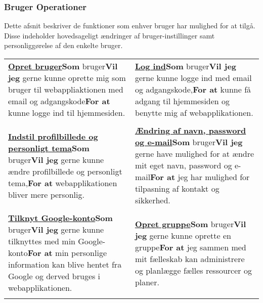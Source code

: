 \subsubsection{Bruger Operationer}

\noindent Dette afsnit beskriver de funktioner som enhver bruger har mulighed for at tilgå. Disse indeholder hovedsageligt ændringer af bruger-instillinger samt personliggørelse af den enkelte bruger.\newline

\begin{tabular}{p{2.5in}p{2.5in}}
\textbf{\underline{Opret bruger}}\newline \textbf{Som} bruger\newline \textbf{Vil jeg} gerne kunne oprette mig som bruger til webappliaktionen med email og adgangskode\newline \textbf{For at} kunne logge ind til hjemmesiden. &

\textbf{\underline{Log ind}}\newline \textbf{Som} bruger\newline \textbf{Vil jeg} gerne kunne logge ind med email og adgangskode,\newline \textbf{For at} kunne få adgang til hjemmesiden og benytte mig af webapplikationen.  \\\\

\textbf{\underline{Indstil profilbillede og personligt tema}}\newline \textbf{Som} bruger\newline \textbf{Vil jeg} gerne kunne ændre profilbillede og personligt tema,\newline \textbf{For at} webapplikationen bliver mere personlig.  &  

\textbf{\underline{Ændring af navn, password og e-mail}}\newline \textbf{Som} bruger\newline \textbf{Vil jeg} gerne have mulighed for at ændre mit eget navn, password og e-mail\newline \textbf{For at} jeg har mulighed for tilpasning af kontakt og sikkerhed.  \\\\

\textbf{\underline{Tilknyt Google-konto}}\newline \textbf{Som} bruger\newline \textbf{Vil jeg} gerne kunne tilknyttes med min Google-konto\newline \textbf{For at} min personlige information kan blive hentet fra Google og derved bruges i webapplikationen.  &

\textbf{\underline{Opret gruppe}}\newline \textbf{Som} bruger\newline \textbf{Vil jeg} gerne kunne oprette en gruppe\newline \textbf{For at} jeg sammen med mit fælleskab kan administrere og planlægge fælles ressourcer og planer. \\\\
\end{tabular}



